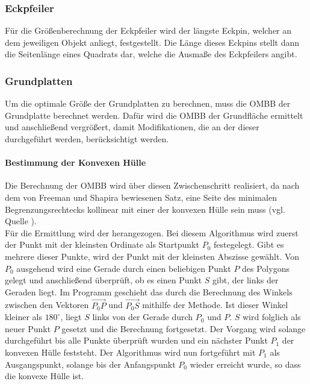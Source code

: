 \subsubsection{Eckpfeiler}
Für die Größenberechnung der Eckpfeiler wird der längste Eckpin, welcher an dem jeweiligen Objekt anliegt, festgestellt.
Die Länge dieses Eckpins stellt dann die Seitenlänge eines Quadrats dar, welche die Ausmaße des Eckpfeilers angibt.

\subsubsection{Grundplatten}
Um die optimale Größe der Grundplatten zu berechnen, muss die OMBB der Grundplatte berechnet werden.
Dafür wird die OMBB der Grundfläche ermittelt und anschließend vergrößert, damit Modifikationen, die an der dieser durchgeführt werden, berücksichtigt werden.

\paragraph{Bestimmung der Konvexen Hülle}
Die Berechnung der OMBB wird über diesen Zwischenschritt realisiert, da nach dem von Freeman und Shapira bewiesenen Satz, eine Seite des minimalen Begrenzungsrechtecks kollinear mit einer der konvexen Hülle sein muss (vgl. Quelle \cite{ombb}). \\
Für die Ermittlung wird der  herangezogen.
Bei diesem Algorithmus wird zuerst der Punkt mit der kleinsten Ordinate als Startpunkt $P_0$ festegelegt.
Gibt es mehrere dieser Punkte, wird der Punkt mit der kleinsten Abszisse gewählt.
Von $P_0$ ausgehend wird eine Gerade durch einen beliebigen Punkt $P$ des Polygons gelegt und anschließend überprüft, ob es einen Punkt $S$ gibt, der links der Geraden liegt.
Im Programm geschieht das durch die Berechnung des Winkels zwischen den Vektoren $\overrightarrow{{P_0}P}$ und $\overrightarrow{{P_0}S}$ mithilfe der  Methode.
Ist dieser Winkel kleiner als $180^\circ$, liegt $S$ links von der Gerade durch $P_0$ und $P$.
$S$ wird folglich als neuer Punkt $P$ gesetzt und die Berechnung fortgesetzt.
Der Vorgang wird solange durchgeführt bis alle Punkte überprüft wurden und ein nächster Punkt $P_1$ der konvexen Hülle feststeht.
Der Algorithmus wird nun fortgeführt mit $P_1$ als Ausgangspunkt, solange bis der Anfangspunkt $P_0$ wieder erreicht wurde, so dass die konvexe Hülle  ist.

